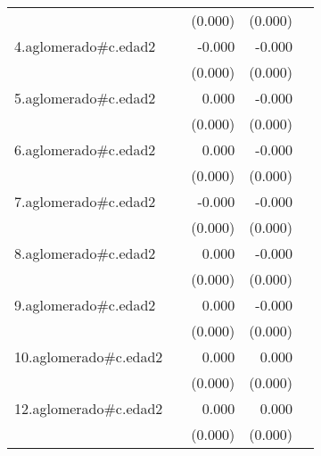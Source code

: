 {\begin{longtable}{l*{4}{D{.}{.}{-1}}}
            &                     &     (0.000)         &     (0.000)         &                     \\
\addlinespace
4.aglomerado#c.edad2&                     &      -0.000         &      -0.000\sym{***}&                     \\
            &                     &     (0.000)         &     (0.000)         &                     \\
\addlinespace
5.aglomerado#c.edad2&                     &       0.000         &      -0.000         &                     \\
            &                     &     (0.000)         &     (0.000)         &                     \\
\addlinespace
6.aglomerado#c.edad2&                     &       0.000         &      -0.000         &                     \\
            &                     &     (0.000)         &     (0.000)         &                     \\
\addlinespace
7.aglomerado#c.edad2&                     &      -0.000         &      -0.000\sym{*}  &                     \\
            &                     &     (0.000)         &     (0.000)         &                     \\
\addlinespace
8.aglomerado#c.edad2&                     &       0.000         &      -0.000         &                     \\
            &                     &     (0.000)         &     (0.000)         &                     \\
\addlinespace
9.aglomerado#c.edad2&                     &       0.000         &      -0.000         &                     \\
            &                     &     (0.000)         &     (0.000)         &                     \\
\addlinespace
10.aglomerado#c.edad2&                     &       0.000         &       0.000         &                     \\
            &                     &     (0.000)         &     (0.000)         &                     \\
\addlinespace
12.aglomerado#c.edad2&                     &       0.000\sym{*}  &       0.000         &                     \\
            &                     &     (0.000)         &     (0.000)         &                     \\

\end{longtable}}
